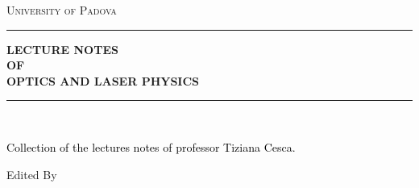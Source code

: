 



\begin{titlepage} %
	
	
	\newcommand{\HRule}{\rule{\linewidth}{0.5mm}} %
	
	\center %
	
	
	\textsc{\LARGE University of Padova}\vspace{1.5cm} %
	
	
	\HRule \vspace{0.5cm}
	
	\textbf{\LARGE LECTURE NOTES\\ OF\\ OPTICS AND LASER PHYSICS\\} %
	\vspace{0.5cm}
	\HRule\\[0.5cm]
	
	\vspace{2\baselineskip} %
	
	
	\textcolor{black}{Collection of the lectures notes of professor Tiziana Cesca.} %
	
	\vspace*{3\baselineskip} %
	
	
	Edited By
	
	\vspace{0.5\baselineskip} %
	

\end{titlepage}
